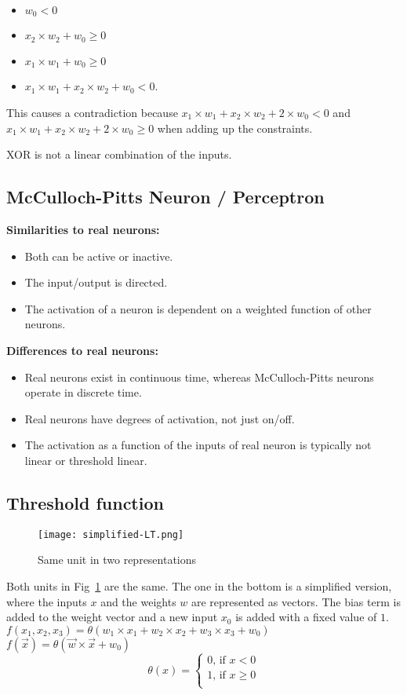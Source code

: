 \documentclass[main]{subfiles}
\begin{document}
\begin{itemize}[noitemsep,nolistsep]
	\item $w_0 < 0$
	\item $x_2 \times w_2 + w_0 \geq 0$
	\item $x_1 \times w_1 + w_0 \geq 0$
	\item $x_1 \times w_1 + x_2 \times w_2 + w_0 < 0$.
\end{itemize}

This causes a contradiction because $x_1 \times w_1 + x_2 \times w_2 + 2 \times w_0 < 0$ and $x_1 \times w_1 + x_2 \times w_2 + 2 \times w_0 \geq 0$ when adding up the constraints.

XOR is not a linear combination of the inputs.

\subsection{McCulloch-Pitts Neuron / Perceptron}
\textbf{Similarities to real neurons:}
\begin{itemize}[noitemsep,nolistsep]
	\item Both can be active or inactive.
	\item The input/output is directed.
	\item The activation of a neuron is dependent on a weighted function of other neurons.
\end{itemize}
\textbf{Differences to real neurons:}
\begin{itemize}[noitemsep,nolistsep]
	\item Real neurons exist in continuous time, whereas McCulloch-Pitts neurons operate in discrete time.
	\item Real neurons have degrees of activation, not just on/off.
	\item The activation as a function of the inputs of real neuron is typically not linear or threshold linear.
\end{itemize}

\subsection{Threshold function}

\begin{figure}[H]
	\centering
	\texttt{[image: simplified-LT.png]}
	\caption{Same unit in two representations}
	\label{fig:simplified-LT}
\end{figure}

Both units in Fig~\ref{fig:simplified-LT} are the same. The one in the bottom is a simplified version, where the inputs $x$ and the weights $w$ are represented as vectors. The bias term is added to the weight vector and a new input $x_0$ is added with a fixed value of $1$.\\
$f(x_1, x_2, x_3) = \theta(w_1 \times x_1 + w_2 \times x_2 + w_3 \times x_3 + w_0)$\\
$f(\vec{x}) = \theta(\vec{w} \times \vec{x} + w_0)$\\

\[
  \theta(x)=
  \begin{cases}
     0 \text{, if } x < 0\\
     1 \text{, if } x \geq 0\\
  \end{cases}
\]
\end{document}

